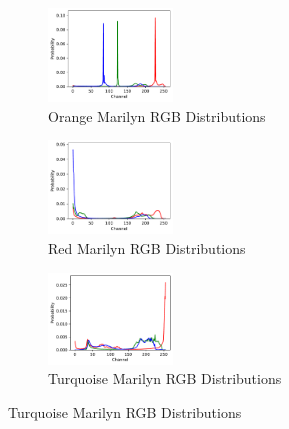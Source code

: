 \documentclass{article}
\begin{document}
\begin{figure}[ht]
  \centering
  \begin{subfigure}{0.3\textwidth}
    \centering
    \includegraphics[width=125px]{main_files/figure-latex/2_1_orange_marilyn_dist.pdf}
    \caption{Orange Marilyn RGB Distributions}
    \label{fig:2_1_orange_marilyn_dist}
  \end{subfigure}
  \hfill
  \begin{subfigure}{0.3\textwidth}
    \centering
    \includegraphics[width=125px]{main_files/figure-latex/2_2_red_marilyn_dist.pdf}
    \caption{Red Marilyn RGB Distributions}
    \label{fig:2_2_red_marilyn_dist}
  \end{subfigure}
  \hfill
  \begin{subfigure}{0.3\textwidth}
    \centering
    \includegraphics[width=125px]{main_files/figure-latex/2_3_turq_marilyn_dist.pdf}
    \caption{Turquoise Marilyn RGB Distributions}
    \label{fig:2_3_turq_marilyn_dist}
  \end{subfigure}

  \vspace{1em}


\end{figure}
\end{document}
